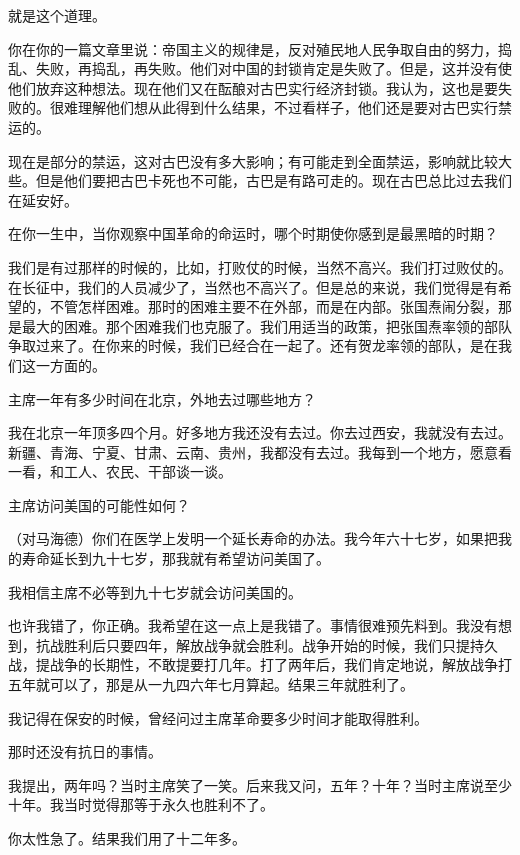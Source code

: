 就是这个道理。

你在你的一篇文章里说：帝国主义的规律是，反对殖民地人民争取自由的努力，捣乱、失败，再捣乱，再失败。他们对中国的封锁肯定是失败了。但是，这并没有使他们放弃这种想法。现在他们又在酝酿对古巴实行经济封锁。我认为，这也是要失败的。很难理解他们想从此得到什么结果，不过看样子，他们还是要对古巴实行禁运的。

现在是部分的禁运，这对古巴没有多大影响；有可能走到全面禁运，影响就比较大些。但是他们要把古巴卡死也不可能，古巴是有路可走的。现在古巴总比过去我们在延安好。

在你一生中，当你观察中国革命的命运时，哪个时期使你感到是最黑暗的时期？

我们是有过那样的时候的，比如，打败仗的时候，当然不高兴。我们打过败仗的。在长征中，我们的人员减少了，当然也不高兴了。但是总的来说，我们觉得是有希望的，不管怎样困难。那时的困难主要不在外部，而是在内部。张国焘闹分裂，那是最大的困难。那个困难我们也克服了。我们用适当的政策，把张国焘率领的部队争取过来了。在你来的时候，我们已经合在一起了。还有贺龙率领的部队，是在我们这一方面的。

主席一年有多少时间在北京，外地去过哪些地方？

我在北京一年顶多四个月。好多地方我还没有去过。你去过西安，我就没有去过。新疆、青海、宁夏、甘肃、云南、贵州，我都没有去过。我每到一个地方，愿意看一看，和工人、农民、干部谈一谈。

主席访问美国的可能性如何？

（对马海德）你们在医学上发明一个延长寿命的办法。我今年六十七岁，如果把我的寿命延长到九十七岁，那我就有希望访问美国了。

我相信主席不必等到九十七岁就会访问美国的。

也许我错了，你正确。我希望在这一点上是我错了。事情很难预先料到。我没有想到，抗战胜利后只要四年，解放战争就会胜利。战争开始的时候，我们只提持久战，提战争的长期性，不敢提要打几年。打了两年后，我们肯定地说，解放战争打五年就可以了，那是从一九四六年七月算起。结果三年就胜利了。

我记得在保安的时候，曾经问过主席革命要多少时间才能取得胜利。

那时还没有抗日的事情。

我提出，两年吗？当时主席笑了一笑。后来我又问，五年？十年？当时主席说至少十年。我当时觉得那等于永久也胜利不了。

你太性急了。结果我们用了十二年多。

